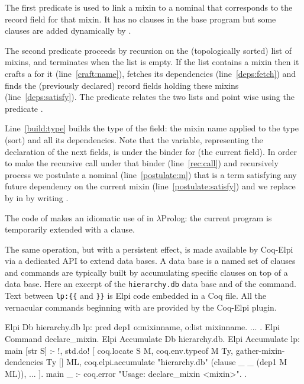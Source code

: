 \documentclass[a4paper,UKenglish,cleveref, autoref]{lipics-v2019}
\newcommand{\mixin}{mixin}
\newcommand{\mixins}{mixins}
\theoremstyle{implem}
\theoremstyle{implem}
\theoremstyle{axiom}
\theoremstyle{abscommand}
\theoremstyle{command}
\begin{document}
{{The first predicate  is used
to link a \mixin{} to a nominal that corresponds to the record field
for that mixin. It has no clauses in the base program but some clauses
are added dynamically by .

The second predicate proceeds by recursion on the (topologically sorted) list of \mixins{},
and terminates when the list is empty. If the list contains a \mixin{} 
then it crafts a  for it (line~\ref{craft:name}),
fetches its dependencies (line~\ref{deps:fetch}) and
finds the (previously declared) record fields holding these \mixins{}
(line~\ref{deps:satisfy}).
The  predicate relates the two lists  and
 point wise using the predicate .

Line~\ref{build:type} builds the type of the field: the \mixin{} name applied
to the type (sort) and all its dependencies.
Note that the  variable, representing the declaration of the
next fields, is under the binder for  (the current field).
In order to make the recursive call under that binder (line~\ref{rec:call})
and recursively process  we postulate a nominal
 (line~\ref{postulate:m}) that is a term satisfying any
future dependency on the current \mixin{} (line~\ref{postulate:satisfy})
and we replace  by  in  by writing
.

The code of  makes an idiomatic use
of \elpi{=>} in $\lambda$Prolog: the current program is temporarily
extended with a clause.

The same operation, but with a persistent
effect, is made available by Coq-Elpi via a dedicated API to extend
data bases. A data base is a named set of clauses and
commands are typically built by accumulating specific clauses on top
of a data base. Here an excerpt of the \verb+hierarchy.db+ data base and
of the  command. Text between \verb+lp:{{+ and \verb+}}+
is Elpi code embedded in a Coq file. All the vernacular commands beginning
with  are provided by the Coq-Elpi plugin.

\begin{coqcode}
Elpi Db hierarchy.db lp:{{
  pred dep1 o:mixinname, o:list mixinname.
  ... %
}}.
Elpi Command declare_mixin.
Elpi Accumulate Db hierarchy.db.
Elpi Accumulate lp:{{
  main [str S] :- !, std.do! [
    coq.locate S M,
    coq.env.typeof M Ty,
    gather-mixin-dendencies Ty [] ML, %
    coq.elpi.accumulate "hierarchy.db" (clause _ _ (dep1 M ML)),
    ...
  ].
  main _ :- coq.error "Usage: declare_mixin <mixin>".
}}.
\end{coqcode}

}}
\end{document}
